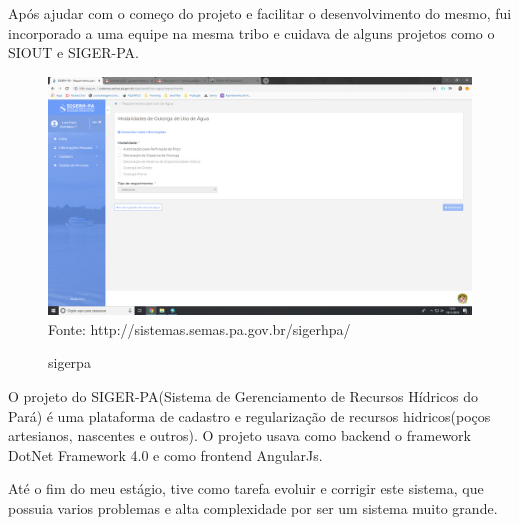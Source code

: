 Após ajudar com o começo do projeto e facilitar o desenvolvimento do mesmo, fui incorporado a uma equipe na mesma tribo e cuidava de alguns projetos como o SIOUT e SIGER-PA.

\begin{figure}[H]
\centering
\caption{sigerpa} %
\includegraphics[scale=0.222]{sigerpa}\\  %
{\small Fonte: http://sistemas.semas.pa.gov.br/sigerhpa/} %
\label{fig:exemplo} %
\end{figure}

O projeto do SIGER-PA(Sistema de Gerenciamento de Recursos Hídricos do Pará) é uma plataforma de cadastro e regularização de recursos hidricos(poços artesianos, nascentes e outros).
O projeto usava como backend o framework DotNet Framework 4.0 e como frontend AngularJs.

Até o fim do meu estágio, tive como tarefa evoluir e corrigir este sistema, que possuia varios problemas e alta complexidade por ser um sistema muito grande.
